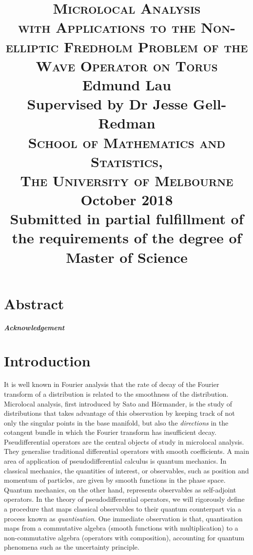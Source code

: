 \documentclass[12pt, twoside]{book}
\title{    
    \textsc{\LARGE \textbf{Microlocal Analysis}} \\
    \textsc{\large \textbf{with Applications to the Non-elliptic Fredholm Problem of the Wave Operator on Torus}} \\ [5em]
    Edmund Lau \\
    Supervised by Dr Jesse Gell-Redman \\ [5em] 
    \textsc{\Large School of Mathematics and Statistics, \\ The University of Melbourne} \\ [5em]
    {\large October 2018} \\
    {\large Submitted in partial fulfillment of the requirements of the degree of Master of Science} \\
}
\date{}
\begin{document}
\maketitle



\chapter*{Abstract}




\paragraph{\LARGE Acknowledgement} \hfill 

\tableofcontents

\chapter{Introduction}

It is well known in Fourier analysis that the rate of decay of the Fourier transform of a distribution is related to the smoothness of the distribution. Microlocal analysis, first introduced by  Sato \cite{Sato1970-on} and H\"ormander\cite{Hormander2007-ws}, is the study of distributions that takes advantage of this observation by keeping track of not only the singular points in the base manifold, but also the \textit{directions} in the cotangent bundle in which the Fourier transform has insufficient decay. \\

Pseudifferential operators are the central objects of study in microlocal analysis. They generalise traditional differential operators with smooth coefficients. A main area of application of pseudodifferential calculus is quantum mechanics\cite{Martinez2002-xg}. In classical  mechanics,  the quantities of interest, or  observables,  such as position and momentum of particles, are given by smooth functions in the phase space. Quantum mechanics, on the other hand, represents observables as self-adjoint operators. In the theory of pseudodifferential operators, we will rigorously define a procedure that maps classical observables to their quantum counterpart via a process known as \textit{quantisation}. One immediate observation is that, quantisation maps from a commutative algebra (smooth functions with multiplication) to a non-commutative algebra (operators with composition), accounting for quantum phenomena such as the uncertainty principle. \\
\end{document}
